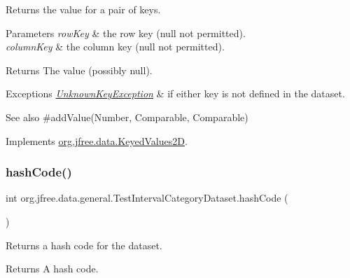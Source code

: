 Returns the value for a pair of keys.


\begin{DoxyParams}{Parameters}
{\em row\+Key} & the row key ({\ttfamily null} not permitted). \\
\hline
{\em column\+Key} & the column key ({\ttfamily null} not permitted).\\
\hline
\end{DoxyParams}
\begin{DoxyReturn}{Returns}
The value (possibly {\ttfamily null}).
\end{DoxyReturn}

\begin{DoxyExceptions}{Exceptions}
{\em \mbox{\hyperlink{classorg_1_1jfree_1_1data_1_1_unknown_key_exception}{Unknown\+Key\+Exception}}} & if either key is not defined in the dataset.\\
\hline
\end{DoxyExceptions}
\begin{DoxySeeAlso}{See also}
\#add\+Value(\+Number, Comparable, Comparable) 
\end{DoxySeeAlso}


Implements \mbox{\hyperlink{interfaceorg_1_1jfree_1_1data_1_1_keyed_values2_d_a61c450ca108cd99e53174fc91393a99a}{org.\+jfree.\+data.\+Keyed\+Values2D}}.

\mbox{\label{classorg_1_1jfree_1_1data_1_1general_1_1_test_interval_category_dataset_a2c9109dd5d936a391aaac0be9f32569a}} 
\subsubsection{\texorpdfstring{hash\+Code()}{hashCode()}}
{\footnotesize\ttfamily int org.\+jfree.\+data.\+general.\+Test\+Interval\+Category\+Dataset.\+hash\+Code (\begin{DoxyParamCaption}{ }\end{DoxyParamCaption})}

Returns a hash code for the dataset.

\begin{DoxyReturn}{Returns}
A hash code. 
\end{DoxyReturn}
\mbox{\label{classorg_1_1jfree_1_1data_1_1general_1_1_test_interval_category_dataset_af614310dfa6e029f6d910793b7e9e3b4}} 
